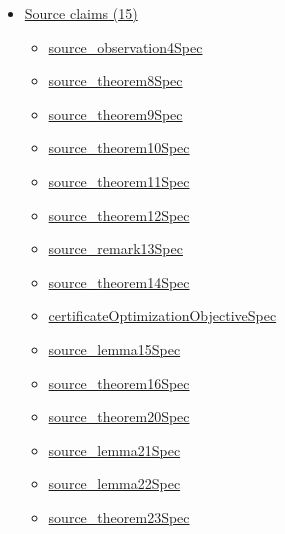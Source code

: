 \documentclass[10pt]{article}
\begin{document}
\begin{itemize}[leftmargin=1.2em]
\begin{itemize}[leftmargin=1.2em]
\item \hyperlink{paper-prerequisite-227de2fce26afc75}{GHKR22\allowbreak{}Bias\allowbreak{}Bounties.\allowbreak{}measure\allowbreak{}Coordinate\allowbreak{}Ascent\allowbreak{}Loop}
\item \hyperlink{paper-prerequisite-dff6b99e26543d78}{GHKR22\allowbreak{}Bias\allowbreak{}Bounties.\allowbreak{}measure\allowbreak{}Model\allowbreak{}Loss}
\item \hyperlink{paper-prerequisite-b5889905f0c62bd2}{GHKR22\allowbreak{}Bias\allowbreak{}Bounties.\allowbreak{}monotone\allowbreak{}Bounty\allowbreak{}Output}
\item \hyperlink{paper-prerequisite-07b48266bf86505a}{GHKR22\allowbreak{}Bias\allowbreak{}Bounties.\allowbreak{}train\allowbreak{}By\allowbreak{}Opt\allowbreak{}Run}
\end{itemize}
\item \hyperlink{source-section-f10b5f68e4acf3dc}{Source claims (15)}
\begin{itemize}[leftmargin=1.2em]
\item \hyperlink{source-claim-e8486a8a28a7a3cb}{source\_\allowbreak{}observation4\allowbreak{}Spec}
\item \hyperlink{source-claim-d280a071f8e2f046}{source\_\allowbreak{}theorem8\allowbreak{}Spec}
\item \hyperlink{source-claim-d3e46ba690488c06}{source\_\allowbreak{}theorem9\allowbreak{}Spec}
\item \hyperlink{source-claim-f5b121c709a75d33}{source\_\allowbreak{}theorem10\allowbreak{}Spec}
\item \hyperlink{source-claim-b381dd2675ca5a7d}{source\_\allowbreak{}theorem11\allowbreak{}Spec}
\item \hyperlink{source-claim-003d53e732ab3276}{source\_\allowbreak{}theorem12\allowbreak{}Spec}
\item \hyperlink{source-claim-975541ba96125a10}{source\_\allowbreak{}remark13\allowbreak{}Spec}
\item \hyperlink{source-claim-e366ac8dda0f0464}{source\_\allowbreak{}theorem14\allowbreak{}Spec}
\item \hyperlink{source-claim-34a9d9f786637448}{certificate\allowbreak{}Optimization\allowbreak{}Objective\allowbreak{}Spec}
\item \hyperlink{source-claim-71e119857b264f9f}{source\_\allowbreak{}lemma15\allowbreak{}Spec}
\item \hyperlink{source-claim-1ecb667b6e564509}{source\_\allowbreak{}theorem16\allowbreak{}Spec}
\item \hyperlink{source-claim-1de02a646e873bbe}{source\_\allowbreak{}theorem20\allowbreak{}Spec}
\item \hyperlink{source-claim-a168dec775709541}{source\_\allowbreak{}lemma21\allowbreak{}Spec}
\item \hyperlink{source-claim-05d0f899160647e9}{source\_\allowbreak{}lemma22\allowbreak{}Spec}
\item \hyperlink{source-claim-9db1d587dce3a240}{source\_\allowbreak{}theorem23\allowbreak{}Spec}
\end{itemize}
\end{itemize}
\end{document}
